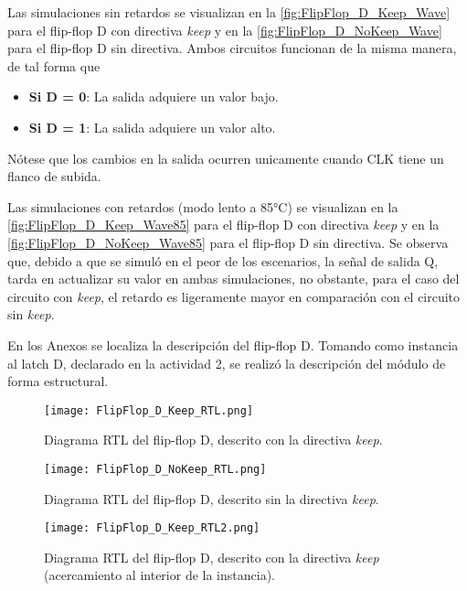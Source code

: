 Las simulaciones sin retardos se visualizan en la \autoref{fig:FlipFlop_D_Keep_Wave} para el flip-flop D con directiva \textit{keep} y en la \autoref{fig:FlipFlop_D_NoKeep_Wave} para el flip-flop D sin directiva. Ambos circuitos funcionan de la misma manera, de tal forma que 

\begin{itemize}
	\item \textbf{Si D = 0}: La salida adquiere un valor bajo.
	\item \textbf{Si D = 1}: La salida adquiere un valor alto.
\end{itemize}

Nótese que los cambios en la salida ocurren unicamente cuando CLK tiene un flanco de subida.

Las simulaciones con retardos (modo lento a 85°C) se visualizan en la \autoref{fig:FlipFlop_D_Keep_Wave85} para el flip-flop D con directiva \textit{keep} y en la \autoref{fig:FlipFlop_D_NoKeep_Wave85} para el flip-flop D sin directiva. Se observa que, debido a que se simuló en el peor de los escenarios, la señal de salida Q, tarda en actualizar su valor en ambas simulaciones, no obstante, para el caso del circuito con \textit{keep}, el retardo es ligeramente mayor en comparación con el circuito sin \textit{keep}.

En los Anexos se localiza la descripción del flip-flop D. Tomando como instancia al latch D, declarado en la actividad 2, se realizó la descripción del módulo de forma estructural.

\begin{figure}[ht]
	\centering
	\texttt{[image: FlipFlop\_D\_Keep\_RTL.png]}
	\caption{Diagrama RTL del flip-flop D, descrito con la directiva \textit{keep}. \label{fig:FlipFlop_D_Keep_RTL}}
\end{figure}

\begin{figure}[ht]
	\centering
	\texttt{[image: FlipFlop\_D\_NoKeep\_RTL.png]}
	\caption{Diagrama RTL del flip-flop D, descrito sin la directiva \textit{keep}. \label{fig:FlipFlop_D_NoKeep_RTL}}
\end{figure}

\begin{figure}[ht]
	\centering
	\texttt{[image: FlipFlop\_D\_Keep\_RTL2.png]}
	\caption{Diagrama RTL del flip-flop D, descrito con la directiva \textit{keep} (acercamiento al interior de la instancia). \label{fig:FlipFlop_D_Keep_RTL2}}
\end{figure}

